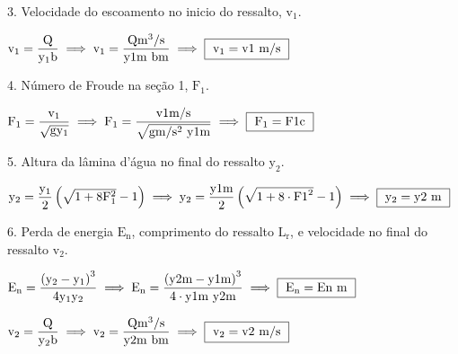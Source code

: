 \documentclass{article}
\newcommand{\myspace}{0.2cm}
\begin{document}
3. Velocidade do escoamento no inicio do ressalto, $\mathrm{ v_{1} }$.
\vspace{\myspace}
\begin{center}
	$ 
		\mathrm
		{ 
			v_{1} = \dfrac{ Q }{ y_{1}b }
		} 
		\implies
		\mathrm
		{
			v_{1} = \dfrac{ {{Q}} m^{3}/s}{ {{y1}}m \  {{b}}m }
		} 
		\implies
		\fbox
		{ 
			$\mathrm{
				v_{1} = {{v1}} \ m/s
			}$
		} 
	$ 
\end{center}
\vspace{\myspace}

4. Número de Froude na seção 1, $\mathrm{ F_{1} }$.
\vspace{\myspace}
\begin{center}
	$ 
		\mathrm
		{ 
			F_{1} = \dfrac{ v_{1} }{ \sqrt{ gy_{1} } }
		} 
		\implies
		\mathrm
		{
			F_{1} = \dfrac{ {{v1}} m/s }{ \sqrt{ {{g}} m/s^{2} \ {{y1}}m } }
		} 
		\implies
		\fbox
		{ 
			$\mathrm
			{ 
				F_{1} = {{F1c}}
			}$
		} 
	$ 
\end{center}
\vspace{\myspace}

5. Altura da lâmina d'água no final do ressalto $\mathrm{ y_{2} }$.
\vspace{\myspace}
\begin{center}
	$
		\mathrm
		{
			y_{2} = \dfrac{ y_{1} }{2}\left ( \sqrt{ 1+ 8F_{1}^{2} } - 1\right )
		}
		\implies 
		\mathrm
		{
			y_{2} = \dfrac{ {{y1}}m }{2} \left ( \sqrt{ 1+ 8 \cdot {{F1}} ^{2} } - 1 \right )
		}
		\implies 
		\fbox
		{
			$\mathrm
			{
				y_{2} = {{y2}} \ m
			}$
		}
	$  
\end{center}
\vspace{\myspace}

6. Perda de energia $\mathrm{ E_{n} }$, comprimento do ressalto $\mathrm{ L_{r} }$, e velocidade no final do ressalto $\mathrm{ v_{2} }$.

\vspace{\myspace}
\begin{center}
	$
		\mathrm
		{
			E_{n} = \dfrac{ \left ( y_{2} - y_{1} \right)^{3} }{ 4y_{1}y_{2} } 
		} 
		\implies
		\mathrm
		{
			E_{n} = \dfrac{ \left ( {{y2}}m - {{y1}}m \right)^{3} }{ 4\cdot {{y1}}m \ {{y2}}m }
		}
		\implies 
		\fbox
		{
			$\mathrm
			{
				E_{n} = {{En}} \ m
			}$
		}
	$  
\end{center}
\vspace{\myspace}


\begin{center}
	$ 
		\mathrm
		{ 
			v_{2} = \dfrac{ Q }{ y_{2}b }
		} 
		\implies
		\mathrm
		{
			v_{2} = \dfrac{ {{Q}} m^{3}/s}{ {{y2}}m \ {{b}}m }
		} 
		\implies
		\fbox
		{ 
			$\mathrm
			{
				v_{2} = {{v2}} \ m/s
			}$
		} 
	$ 
\end{center}
\vspace{\myspace}
\end{document}
